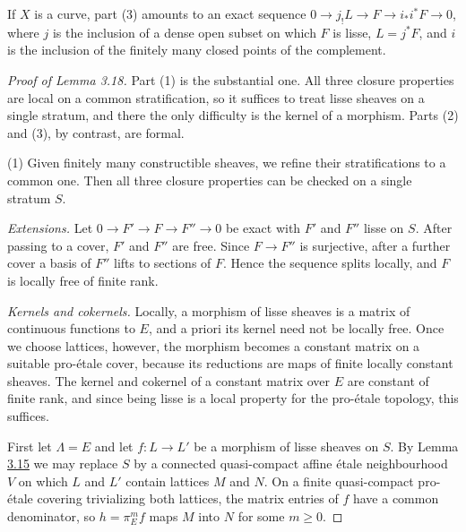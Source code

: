 \documentclass[11pt]{article}
\begin{document}
\label{bp249}%
If \(X\) is a curve, part (3) amounts to an exact sequence \(0\to j_!L\to F\to i_*i^*F\to0\), where \(j\) is the inclusion of a dense open subset on which \(F\) is lisse, \(L=j^*F\), and \(i\) is the inclusion of the finitely many closed points of the complement.

\begin{proof}[{Proof of Lemma 3.18}]\label{bp250}%
Part (1) is the substantial one. All three closure properties are local on a common stratification, so it suffices to treat lisse sheaves on a single stratum, and there the only difficulty is the kernel of a morphism. Parts (2) and (3), by contrast, are formal.

(1) Given finitely many constructible sheaves, we refine their stratifications to a common one. Then all three closure properties can be checked on a single stratum \(S\).

\emph{Extensions.} Let \(0\to F'\to F\to F''\to0\) be exact with \(F'\) and \(F''\) lisse on \(S\). After passing to a cover, \(F'\) and \(F''\) are free. Since \(F\to F''\) is surjective, after a further cover a basis of \(F''\) lifts to sections of \(F\). Hence the sequence splits locally, and \(F\) is locally free of finite rank.

\emph{Kernels and cokernels.} Locally, a morphism of lisse sheaves is a matrix of continuous functions to \(E\), and a priori its kernel need not be locally free. Once we choose lattices, however, the morphism becomes a constant matrix on a suitable pro-étale cover, because its reductions are maps of finite locally constant sheaves. The kernel and cokernel of a constant matrix over \(E\) are constant of finite rank, and since being lisse is a local property for the pro-étale topology, this suffices.

First let \(\Lambda=E\) and let \(f:L\to L'\) be a morphism of lisse sheaves on \(S\). By Lemma \hyperref[bp240]{3.15} we may replace \(S\) by a connected quasi-compact affine étale neighbourhood \(V\) on which \(L\) and \(L'\) contain lattices \(M\) and \(N\). On a finite quasi-compact pro-étale covering trivializing both lattices, the matrix entries of \(f\) have a common denominator, so \(h=\pi_E^mf\) maps \(M\) into \(N\) for some \(m\ge0\).


\end{proof}
\end{document}
